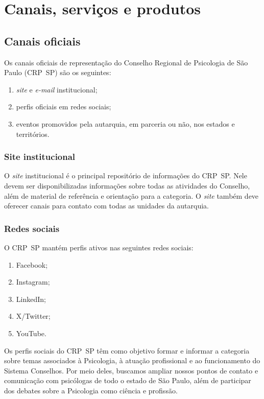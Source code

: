 \chapter{Canais, serviços e
  produtos}

\section{Canais oficiais}

Os canais oficiais de representação do Conselho Regional de Psicologia
de São Paulo (CRP~SP) são os seguintes:

\begin{enumerate}

  \item
        \emph{site} e \emph{e-mail} institucional;
  \item
        perfis oficiais em redes sociais;
  \item
        eventos promovidos pela autarquia, em parceria ou não, nos estados e
        territórios.
\end{enumerate}

\subsection{Site institucional}

O \emph{site} institucional é o principal repositório de informações do
CRP~SP. Nele devem ser disponibilizadas informações sobre todas as
atividades do Conselho, além de material de referência e orientação para
a categoria. O \emph{site} também deve oferecer canais para contato com
todas as unidades da autarquia.

\subsection{Redes sociais}

O CRP~SP mantém perfis ativos nas seguintes redes sociais:

\begin{enumerate}

  \item
        Facebook;
  \item
        Instagram;
  \item
        LinkedIn;
  \item
        X/Twitter;
  \item
        YouTube.
\end{enumerate}

Os perfis sociais do CRP~SP têm como objetivo formar e informar a
categoria sobre temas associados à Psicologia, à atuação profissional e
ao funcionamento do Sistema Conselhos. Por meio deles, buscamos ampliar
nossos pontos de contato e comunicação com psicólogas de todo o estado
de São Paulo, além de participar dos debates sobre a Psicologia como
ciência e profissão.

